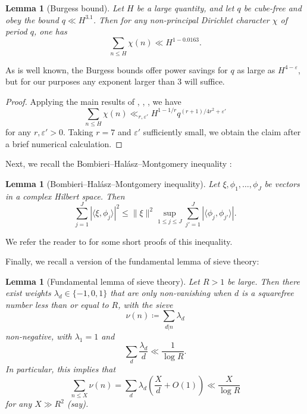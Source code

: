 \documentclass[12pt]{amsart}
\newtheorem{lemma}[theorem]{Lemma}
\newcommand{\eps}{\varepsilon}
\begin{document}
\begin{lemma}[Burgess bound]\label{burgess-bound}  Let $H$ be a large quantity, and let $q$ be cube-free and obey the bound $q \ll H^{3.1}$.  Then for any non-principal Dirichlet character $\chi$ of period $q$, one has
$$ \sum_{n \leq H} \chi(n) \ll H^{1-0.0163}.$$
\end{lemma}

As is well known, the Burgess bounds offer power savings for $q$ as large as $H^{4-\eps}$, but for our purposes any exponent larger than $3$ will suffice.

\begin{proof}  Applying the main results of \cite{burg1}, \cite{burg2}, \cite{burg3}, we have
$$ \sum_{n \leq H} \chi(n) \ll_{r,\eps'} H^{1-1/r} q^{(r+1)/4r^2 + \eps'}$$
for any $r,\eps'>0$.  Taking $r=7$ and $\eps'$ sufficiently small, we obtain the claim after a brief numerical calculation.
\end{proof}

Next, we recall the Bombieri--Hal\'asz--Montgomery inequality \cite{bombieri}:

\begin{lemma}[Bombieri--Hal\'asz--Montgomery inequality]\label{bombieri-halasz-montgomery} Let $\xi, \phi_1,\dots,\phi_J$ be vectors in a complex Hilbert space.  Then
$$ \sum_{j=1}^J|\langle \xi, \phi_j \rangle|^2 \leq \| \xi \|^2 \sup_{1 \leq j \leq J} \sum_{j'=1}^J |\langle \phi_j, \phi_{j'}\rangle|.
$$
\end{lemma}

We refer the reader to \cite{harcos} for some short proofs of this inequality.

Finally, we recall a version of the fundamental lemma of sieve theory:

\begin{lemma}[Fundamental lemma of sieve theory]\label{fund-lemma}  Let $R > 1$ be large.  Then there exist weights $\lambda_d \in \{-1,0,1\}$ that are only non-vanishing when $d$ is a squarefree number less than or equal to $R$, with the sieve
$$ \nu(n) \coloneqq \sum_{d|n} \lambda_d$$
non-negative, with $\lambda_1 = 1$ and
$$ \sum_{d} \frac{\lambda_d}{d} \ll \frac{1}{\log R}.$$
In particular, this implies that
\begin{equation}\label{nx}
     \sum_{n \leq X} \nu(n) = \sum_d \lambda_d \left(\frac{X}{d}+O(1)\right) \ll \frac{X}{\log R}
\end{equation}
for any $X \gg R^2$ (say).
\end{lemma}
\end{document}
